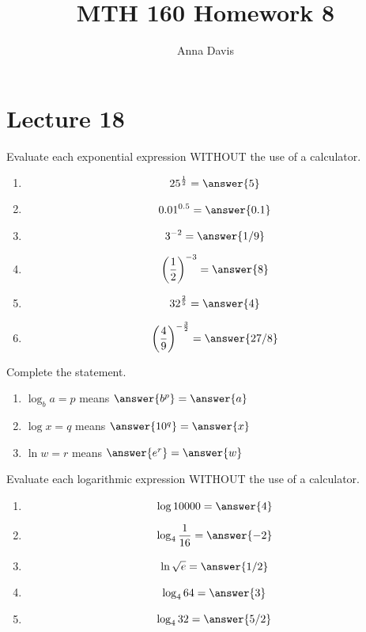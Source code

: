 \documentclass{ximera}
\author{Anna Davis} \title{MTH 160 Homework 8}
\begin{document}
\begin{abstract}

\end{abstract}
\maketitle
 
 \section{Lecture 18}

\begin{problem}\label{prob:160hom7prob7}
Evaluate each exponential expression WITHOUT the use of a calculator.  
\begin{enumerate}
    \item $$25^{\frac{1}{2}}=\answer{5}$$
    \item $$0.01^{0.5}=\answer{0.1}$$
    \item $$3^{-2}=\answer{1/9}$$
    \item $$\left(\frac{1}{2}\right)^{-3}=\answer{8}$$
    \item $$32^{\frac{2}{5}}=\answer{4}$$
    \item $$\left(\frac{4}{9}\right)^{-\frac{3}{2}}=\answer{27/8}$$
\end{enumerate}
\end{problem}

\begin{problem}\label{prob:160hom7prob8}
Complete the statement.
 \begin{enumerate}
     \item 
 $\log_b a=p$ means $\answer{b^p}=\answer{a}$
 \item
 $\log x=q$ means $\answer{10^q}=\answer{x}$
 \item
 $\ln w=r$ means $\answer{e^r}=\answer{w}$
 \end{enumerate}
 \end{problem}
 
 \begin{problem}\label{prob:160hom7prob9}
 Evaluate each logarithmic expression WITHOUT the use of a calculator.
 \begin{enumerate}
     \item $$\log 10000=\answer{4}$$
     \item $$\log_4\frac{1}{16}=\answer{-2}$$
     \item $$\ln\sqrt{e}=\answer{1/2}$$
     \item $$\log_4 64=\answer{3}$$
     \item $$\log_4 32=\answer{5/2}$$
 \end{enumerate}
 \end{problem}
 
\end{document}
